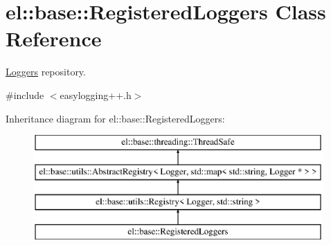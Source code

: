 \hypertarget{classel_1_1base_1_1_registered_loggers}{}\section{el\+:\+:base\+:\+:Registered\+Loggers Class Reference}
\label{classel_1_1base_1_1_registered_loggers}


\hyperlink{classel_1_1_loggers}{Loggers} repository.  




{\ttfamily \#include $<$easylogging++.\+h$>$}

Inheritance diagram for el\+:\+:base\+:\+:Registered\+Loggers\+:\begin{figure}[H]
\begin{center}
\leavevmode
\includegraphics[height=4.000000cm]{classel_1_1base_1_1_registered_loggers}
\end{center}
\end{figure}
